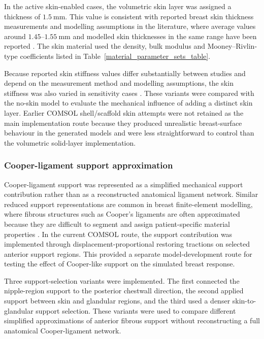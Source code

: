 In the active skin-enabled cases, the volumetric skin layer was assigned a thickness of $1.5~\mathrm{mm}$. This value is consistent with reported breast skin thickness measurements and modelling assumptions in the literature, where average values around $1.45$--$1.55~\mathrm{mm}$ and modelled skin thicknesses in the same range have been reported \cite{Huang2008,Sutradhar2012,Hsu2011,Chen2025}. The skin material used the density, bulk modulus and Mooney--Rivlin-type coefficients listed in Table~\ref{material_parameter_sets_table}.

Because reported skin stiffness values differ substantially between studies and depend on the measurement method and modelling assumptions, the skin stiffness was also varied in sensitivity cases \cite{Ramiao2016,Teixeira2023}. These variants were compared with the no-skin model to evaluate the mechanical influence of adding a distinct skin layer. Earlier COMSOL shell/scaffold skin attempts were not retained as the main implementation route because they produced unrealistic breast-surface behaviour in the generated models and were less straightforward to control than the volumetric solid-layer implementation.

\subsubsection{Cooper-ligament support approximation}
\label{cooper_ligament_support_approximation}

Cooper-ligament support was represented as a simplified mechanical support contribution rather than as a reconstructed anatomical ligament network. Similar reduced support representations are common in breast finite-element modelling, where fibrous structures such as Cooper's ligaments are often approximated because they are difficult to segment and assign patient-specific material properties \cite{Chen2025,Teixeira2023,Mazier2024}. In the current COMSOL route, the support contribution was implemented through displacement-proportional restoring tractions on selected anterior support regions. This provided a separate model-development route for testing the effect of Cooper-like support on the simulated breast response.

Three support-selection variants were implemented. The first connected the nipple-region support to the posterior chestwall direction, the second applied support between skin and glandular regions, and the third used a denser skin-to-glandular support selection. These variants were used to compare different simplified approximations of anterior fibrous support without reconstructing a full anatomical Cooper-ligament network.

